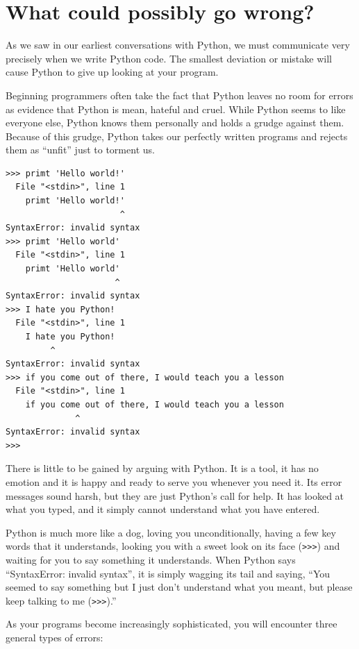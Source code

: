 \documentclass[11pt]{book}
\begin{document}
\section{What could possibly go wrong?}

As we saw in our earliest conversations with Python, we must
communicate very precisely when we write Python code.  The smallest
deviation or mistake will cause Python to give up looking at your
program.

Beginning programmers often take the fact that Python leaves no
room for errors as evidence that Python is mean, hateful and cruel.
While Python seems to like everyone else, Python knows them 
personally and holds a grudge against them.  Because of this grudge,
Python takes our perfectly written programs and rejects them as 
``unfit'' just to torment us.

\beforeverb
\begin{verbatim}
>>> primt 'Hello world!'
  File "<stdin>", line 1
    primt 'Hello world!'
                       ^
SyntaxError: invalid syntax
>>> primt 'Hello world'
  File "<stdin>", line 1
    primt 'Hello world'
                      ^
SyntaxError: invalid syntax
>>> I hate you Python!
  File "<stdin>", line 1
    I hate you Python!
         ^
SyntaxError: invalid syntax
>>> if you come out of there, I would teach you a lesson
  File "<stdin>", line 1
    if you come out of there, I would teach you a lesson
              ^
SyntaxError: invalid syntax
>>> 
\end{verbatim}
\afterverb
%
There is little to be gained by arguing with Python.  It is a tool,
it has no emotion and it is happy and ready to serve you whenever you
need it.  Its error messages sound harsh, but they are just Python's
call for help.  It has looked at what you typed, and it simply cannot
understand what you have entered.

Python is much more like a dog, loving you unconditionally, having a few
key words that it understands, looking you with a sweet look on its
face ({\tt >>>}) and waiting for you to say something it understands.
When Python says ``SyntaxError: invalid syntax'', it is simply wagging
its tail and saying, ``You seemed to say something but I just don't
understand what you meant, but please keep talking to me ({\tt >>>}).''

As your programs become increasingly sophisticated, you will encounter three 
general types of errors:
\end{document}

